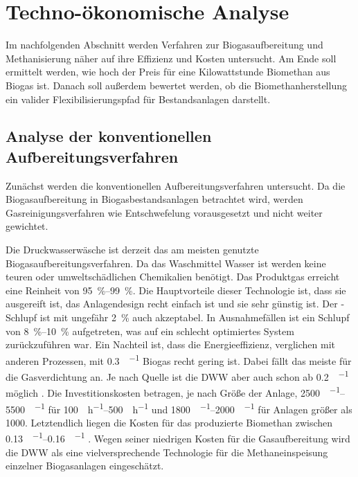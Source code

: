 
\section{Techno-ökonomische Analyse}

Im nachfolgenden Abschnitt werden Verfahren zur Biogasaufbereitung und Methanisierung näher auf ihre Effizienz und Kosten untersucht. Am Ende soll ermittelt werden, wie hoch der Preis für eine Kilowattstunde Biomethan aus Biogas ist. Danach soll außerdem bewertet werden, ob die Biomethanherstellung ein valider Flexibilisierungspfad für Bestandsanlagen darstellt. 

\subsection{Analyse der konventionellen Aufbereitungsverfahren}
Zunächst werden die konventionellen Aufbereitungsverfahren untersucht. Da die Biogasaufbereitung in Biogasbestandsanlagen betrachtet wird, werden Gasreinigungsverfahren wie Entschwefelung vorausgesetzt und nicht weiter gewichtet.  \smallskip

Die Druckwasserwäsche ist derzeit das am meisten genutzte Biogasaufbereitungsverfahren. Da das Waschmittel Wasser ist werden keine teuren oder umweltschädlichen Chemikalien benötigt. Das Produktgas erreicht eine  Reinheit von \SIrange{95}{99}{\percent}. Die Hauptvorteile dieser Technologie ist, dass sie ausgereift ist, das Anlagendesign recht einfach ist und sie sehr günstig ist. Der -Schlupf ist mit ungefähr \SI{2}{\percent} auch akzeptabel. In Ausnahmefällen ist ein Schlupf von \SIrange{8}{10}{\percent} aufgetreten, was auf ein schlecht optimiertes System zurückzuführen war. Ein Nachteil ist, dass die Energieeffizienz, verglichen mit anderen Prozessen, mit \SI{0,3}{\kwh\per\normvol} Biogas recht gering ist. Dabei fällt das meiste für die Gasverdichtung an. Je nach Quelle ist die \gls{DWW} aber auch schon ab \SI{0,2}{\kwh\per\normvol} möglich \parencite{Coll17} \parencite{Emp18}. Die Investitionskosten betragen, je nach Größe der Anlage, \SIrange{2500}{5500}{\sieuro\per\normvolh} für \SIrange{100}{500}{\normvol\per\hour} und \SIrange{1800}{2000}{\sieuro\per\normvolh} für Anlagen größer als \SI{1000}{\normvolh}. Letztendlich liegen die Kosten für das produzierte Biomethan zwischen \SIrange{0,13}{0,16}{\sieuro\per\normvol} \parencite{Emp18}. Wegen seiner niedrigen Kosten für die Gasaufbereitung wird die \gls{DWW} als eine vielversprechende Technologie für die Methaneinspeisung einzelner Biogasanlagen eingeschätzt. \parencite{KGKK2019} \parencite{Struk20}\\

